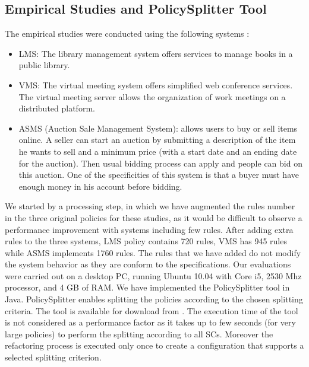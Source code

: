 \subsection{Empirical Studies and PolicySplitter Tool}
The empirical studies were conducted using the following systems \cite{testcase}:
\begin{itemize}	
\item LMS: The library management system offers services to manage books in a public library.
\item VMS: The virtual meeting system offers simplified web conference services. The virtual meeting server allows the organization of work meetings on 
a distributed platform.
\item ASMS (Auction Sale Management System): allows users to buy or sell items online. A seller can start an auction by submitting a description of the
item he wants to sell and a minimum price (with a start date and an ending date for the auction). Then usual bidding process can apply and people can bid 
on this auction. One of the specificities of this system is that a buyer must have enough money in his account before bidding.
\end{itemize}
We started by a processing step, in which we have augmented the rules number in the three original policies for these studies, as it would be difficult
 to observe a performance improvement with systems including few rules. After adding extra rules to the three systems, LMS policy contains 720 rules, 
VMS has 945 rules while ASMS implements 1760 rules. 
The rules that we have added do not modify the system behavior as they are conform to the specifications. Our evaluations were carried out on a desktop PC, 
running Ubuntu 10.04 with Core i5, 2530 Mhz processor, and 4 GB of RAM. 
We have implemented the PolicySplitter tool in Java. PolicySplitter enables splitting the policies according to the chosen splitting criteria. 
The tool is available for download from \cite{splitter}.
The execution time of the tool is not considered as a performance factor as it takes up to few seconds (for very large policies) to perform the splitting 
according to all SCs. Moreover the refactoring process is executed only once to create a configuration that supports a selected splitting criterion.


